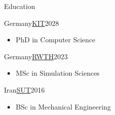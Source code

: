 \begin{cvsection}{Education}
\begin{cvsubsection}{Germany}{\href{https://www.kit.edu/english/index.php}{KIT}}{2028}
		\begin{itemize}
			\item PhD in Computer Science
		\end{itemize}
	\end{cvsubsection}


	\begin{cvsubsection}{Germany}{\href{https://www.rwth-aachen.de/go/id/a/?lidx=1}{RWTH}}{2023}
		\begin{itemize}
			\item MSc in Simulation Sciences
		\end{itemize}
	\end{cvsubsection}

	\begin{cvsubsection}{Iran}{\href{https://en.sharif.ir/}{SUT}}{2016}
		\begin{itemize}
			\item BSc in Mechanical Engineering
		\end{itemize}
	\end{cvsubsection}
\end{cvsection}